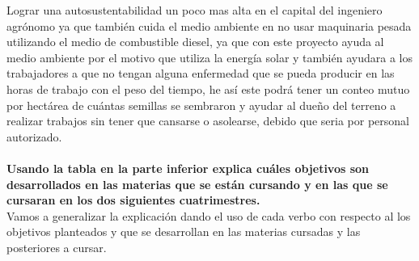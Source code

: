\documentclass[11pt,a4paper]{article}
\begin{document}
Lograr una autosustentabilidad un poco mas alta en el capital del ingeniero agrónomo ya que también cuida el medio ambiente en no usar maquinaria pesada utilizando el medio de combustible diesel, ya que con este proyecto ayuda al medio ambiente por el motivo que utiliza la energía solar y también ayudara a los trabajadores a que no tengan alguna enfermedad que se pueda producir en las horas de trabajo con el peso del tiempo, he así este podrá tener un conteo mutuo por hectárea de cuántas semillas se sembraron y ayudar al dueño del terreno a realizar trabajos sin tener que cansarse o asolearse, debido que seria por personal autorizado.\\\\
\textbf{Usando la tabla en la parte inferior explica cuáles objetivos son desarrollados en las materias que se están cursando y en las que se cursaran en los dos siguientes cuatrimestres.}\\
Vamos a generalizar la explicación dando el uso de cada verbo con respecto al los objetivos planteados y que se desarrollan en las materias cursadas y las posteriores a cursar.\\\\
\end{document}
